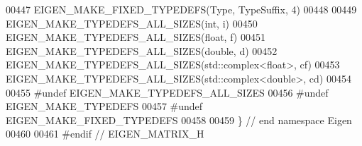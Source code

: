 \begin{DoxyCode}
00447 \textcolor{preprocessor}{EIGEN\_MAKE\_FIXED\_TYPEDEFS(Type, TypeSuffix, 4)}
00448 
00449 EIGEN\_MAKE\_TYPEDEFS\_ALL\_SIZES(\textcolor{keywordtype}{int},                  i)
00450 EIGEN\_MAKE\_TYPEDEFS\_ALL\_SIZES(\textcolor{keywordtype}{float},                f)
00451 EIGEN\_MAKE\_TYPEDEFS\_ALL\_SIZES(\textcolor{keywordtype}{double},               d)
00452 EIGEN\_MAKE\_TYPEDEFS\_ALL\_SIZES(std::complex<float>,  cf)
00453 EIGEN\_MAKE\_TYPEDEFS\_ALL\_SIZES(std::complex<double>, cd)
00454 
00455 \textcolor{preprocessor}{#undef EIGEN\_MAKE\_TYPEDEFS\_ALL\_SIZES}
00456 \textcolor{preprocessor}{#undef EIGEN\_MAKE\_TYPEDEFS}
00457 \textcolor{preprocessor}{#undef EIGEN\_MAKE\_FIXED\_TYPEDEFS}
00458 
00459 \} \textcolor{comment}{// end namespace Eigen}
00460 
00461 \textcolor{preprocessor}{#endif // EIGEN\_MATRIX\_H}
\end{DoxyCode}
